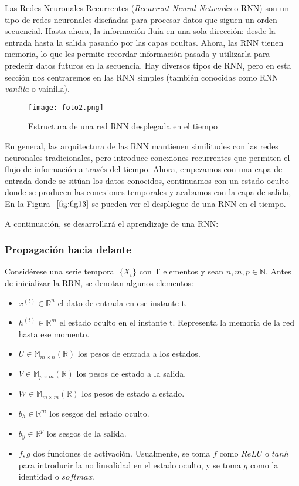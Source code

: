 \documentclass[12pt,twoside]{article}
\begin{document}
 Las Redes Neuronales Recurrentes (\textit{Recurrent Neural Networks} o RNN) \cite{rnn1} son un tipo de redes neuronales diseñadas para procesar datos que siguen un orden secuencial. Hasta ahora, la información fluía en una sola dirección: desde la entrada hasta la salida pasando por las capas ocultas. Ahora, las RNN tienen memoria, lo que les permite recordar información pasada y utilizarla para predecir datos futuros en la secuencia. Hay diversos tipos de RNN, pero en esta sección nos centraremos en las RNN simples (también conocidas como RNN \textit{vanilla} o vainilla).


\begin{figure}[h]
    \centering
    \texttt{[image: foto2.png]}
    \caption{Estructura de una red RNN desplegada en el tiempo} 
    \label{fig:fig13}
\end{figure}

En general, las arquitectura de las RNN mantienen similitudes con las redes neuronales tradicionales, pero introduce conexiones recurrentes que permiten el flujo de información a través del tiempo. Ahora, empezamos con una capa de entrada donde se sitúan los datos conocidos, continuamos con un estado oculto donde se producen las conexiones temporales y acabamos con la capa de salida, En la Figura $~\ref{fig:fig13}$ se pueden ver el despliegue de una RNN en el tiempo. 

A continuación, se desarrollará el aprendizaje \cite{rnn2} de una RNN:

\subsubsection{Propagación hacia delante}\label{sec:15}


Considérese una serie temporal $\{X_t\}$ con T elementos y sean $n,m,p \in \mathbb{N}$. Antes de inicializar la RRN, se denotan algunos elementos: 

\begin{itemize}
    \item $x^{(t)} \in \mathbb{R}^n$ el dato de entrada en ese instante t.
    \item $h^{(t)} \in \mathbb{R}^m$ el estado oculto en el instante t. Representa la memoria de la red hasta ese momento.
    \item $U \in \mathbb{M}_{m \times n}(\mathbb{R})$ los pesos de entrada a los estados.
    \item $V \in \mathbb{M}_{p \times m}(\mathbb{R})$ los pesos de estado a la salida.
    \item $W \in \mathbb{M}_{m \times m}(\mathbb{R})$ los pesos de estado a estado.
    \item $b_h \in \mathbb{R}^m$ los sesgos del estado oculto.
    \item $b_y \in \mathbb{R}^p$ los sesgos de la salida.
    \item $f,g$ dos funciones de activación. Usualmente, se toma $f$ como $ReLU$ o $tanh$ para introducir la no linealidad en el estado oculto, y se toma $g$ como la identidad o $softmax$.
\end{itemize}
\end{document}
